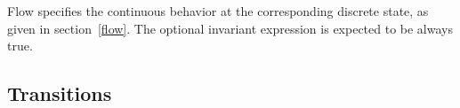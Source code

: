 {\nont Flow} specifies the continuous behavior at the corresponding
discrete state, as given in section~\ref{flow}.  The optional {\tok
invariant} expression is expected to be always true.

\begin{comment}
If {\nont flow} is not given for a state, and
there is no {\tok default} flow, then it is an error if time starts
flowing in that state.
\end{comment}

%

\subsection{Transitions\label{transitions}}


